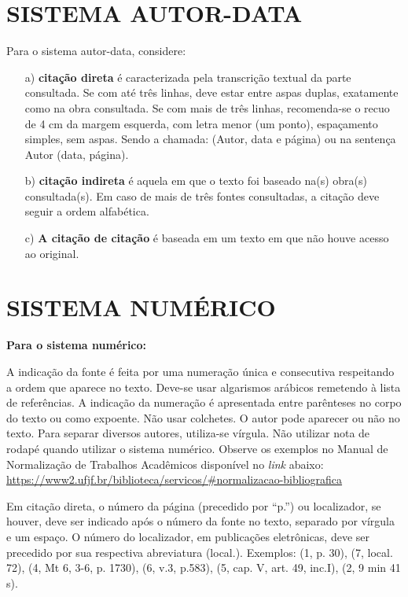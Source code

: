 \documentclass[
  oneside, %
  english,
  brazil
]{abntbibufjf}
\begin{document}
\section{SISTEMA AUTOR-DATA}

Para o sistema autor-data, considere:
\begin{itemize}
  \item[a)]
    \textbf{citação direta} é caracterizada pela transcrição textual da parte consultada.
    Se com até três linhas, deve estar entre aspas duplas, exatamente como na obra consultada.
    Se com mais de três linhas, recomenda-se o recuo de 4 cm da margem esquerda, com letra menor (um ponto), espaçamento simples, sem aspas.
    Sendo a chamada: (Autor, data e página) ou na sentença Autor (data, página).
  \item[b)]
    \textbf{citação indireta} é aquela em que o texto foi baseado na(s) obra(s) consultada(s).
    Em caso de mais de três fontes consultadas, a citação deve seguir a ordem alfabética.
  \item[c)]
    \textbf{A citação de citação} é baseada em um texto em que não houve acesso ao original.
\end{itemize}


\section{SISTEMA NUMÉRICO}

\textbf{Para o sistema numérico:}

A indicação da fonte é feita por uma numeração única e consecutiva respeitando a ordem que aparece no texto.
Deve-se usar algarismos arábicos remetendo à lista de referências.
A indicação da numeração é apresentada entre parênteses no corpo do texto ou como expoente.
Não usar colchetes.
O autor pode aparecer ou não no texto.
Para separar diversos autores, utiliza-se vírgula.
Não utilizar nota de rodapé quando utilizar o sistema numérico.
Observe os exemplos no Manual de Normalização de Trabalhos Acadêmicos disponível no \textit{link} abaixo:\\
\url{https://www2.ufjf.br/biblioteca/servicos/#normalizacao-bibliografica}

Em citação direta, o número da página (precedido por ``p.'') ou localizador, se houver, deve ser indicado após o número da fonte no texto, separado por vírgula e um espaço.
O número do localizador, em publicações eletrônicas, deve ser precedido por sua respectiva abreviatura (local.).
Exemplos: (1, p. 30), (7, local. 72), (4, Mt 6, 3-6, p. 1730), (6, v.3, p.583), (5, cap. V, art. 49, inc.I), (2, 9 min 41 s).
\end{document}
